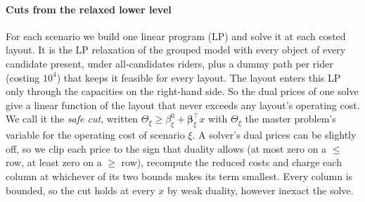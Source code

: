 \paragraph*{Cuts from the relaxed lower level}
For each scenario we build one linear program (LP) and solve it at each costed layout. It is the LP relaxation of the grouped model with every object of every candidate present, under all-candidates riders, plus a dummy path per rider (costing $10^4$\usd{}) that keeps it feasible for every layout. The layout enters this LP only through the capacities on the right-hand side. So the dual prices of one solve give a linear function of the layout that never exceeds any layout's operating cost. We call it the \emph{safe cut}, written $\Theta_\xi\ge\beta^0_\xi+\boldsymbol\beta_\xi^\top x$ with $\Theta_\xi$ the master problem's variable for the operating cost of scenario $\xi$. A solver's dual prices can be slightly off, so we clip each price to the sign that duality allows (at most zero on a $\le$ row, at least zero on a $\ge$ row), recompute the reduced costs and charge each column at whichever of its two bounds makes its term smallest. Every column is bounded, so the cut holds at every $x$ by weak duality, however inexact the solve.

